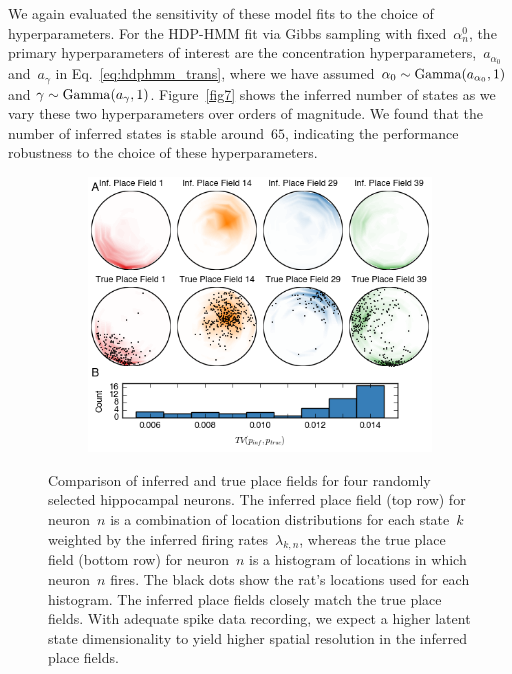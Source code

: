 We again evaluated the sensitivity of these model fits to the choice
of hyperparameters. For the HDP-HMM fit via Gibbs sampling with
fixed~$\alpha_n^0$, the primary hyperparameters of interest are the
concentration hyperparameters,~$a_{\alpha_0}$ and~$a_{\gamma}$ in
Eq.~\ref{eq:hdphmm_trans}, where we have assumed $ \alpha_0 \sim
\mathrm{Gamma}(a_{\alpha_0}, 1)$ and $ \gamma \sim \mathrm{Gamma}(a_\gamma, 1)
$.  Figure~\ref{fig7} shows the inferred number of states as we vary
these two hyperparameters over orders of magnitude. We found that the
number of inferred states is stable around~$65$, indicating the
performance robustness to the choice of these hyperparameters.

\begin{figure}
  \centering
  \begin{subfigure}[t]{5in}
    \includegraphics[width=\textwidth]{figures/ch5/Fig8}
  \end{subfigure}
  \caption[True and inferred place field comparison]{Comparison of
    inferred and true place fields for four randomly selected
    hippocampal neurons. The inferred place field (top row) for
    neuron~$n$ is a combination of location distributions for each
    state~$k$ weighted by the inferred firing rates~$\lambda_{k,n}$,
    whereas the true place field (bottom row) for neuron~$n$ is a
    histogram of locations in which neuron~$n$ fires. The black dots
    show the rat's locations used for each histogram. The inferred
    place fields closely match the true place fields. With adequate
    spike data recording, we expect a higher latent state
    dimensionality to yield higher spatial resolution in the inferred
    place fields.}
  \label{fig8}
\end{figure}

